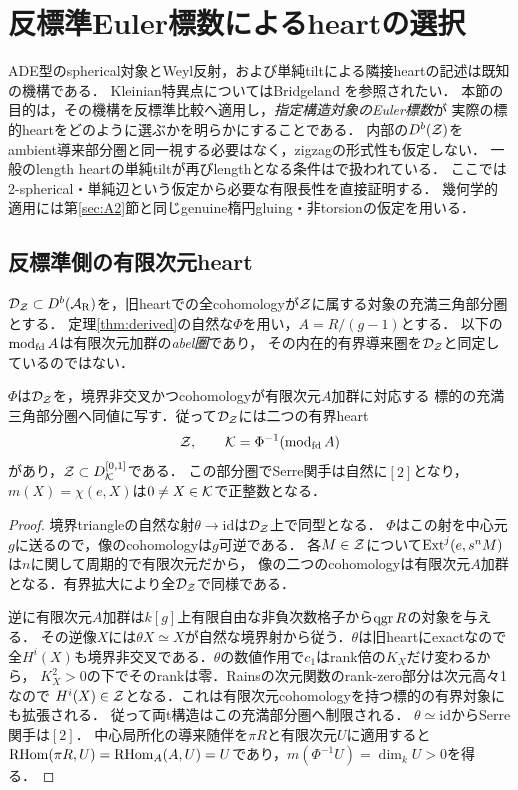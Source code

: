 \section{反標準Euler標数によるheartの選択}\label{sec:rootchambers}
ADE型のspherical対象とWeyl反射，および単純tiltによる隣接heartの記述は既知の機構である．
Kleinian特異点についてはBridgeland \cite[\S2, Lemma 3.5]{BridgelandKleinian}を参照されたい．
本節の目的は，その機構を反標準比較へ適用し，\emph{指定構造対象のEuler標数}が
実際の標的heartをどのように選ぶかを明らかにすることである．
内部の$D^b(\mathcal Z)$をambient導来部分圏と同一視する必要はなく，zigzagの形式性も仮定しない．
一般のlength heartの単純tiltが再びlengthとなる条件は\cite[Theorem 2.7]{BCPW}で扱われている．
ここでは2-spherical・単純辺という仮定から必要な有限長性を直接証明する．
幾何学的適用には第\ref{sec:A2}節と同じgenuine楕円gluing・非torsionの仮定を用いる．

\subsection{反標準側の有限次元heart}
$\mathcal D_{\mathcal Z}\subset D^b(\mathcal A_{\mathrm R})$を，旧heartでの全cohomologyが$\mathcal Z$に属する対象の充満三角部分圏とする．
定理\ref{thm:derived}の自然な$\Phi$を用い，$A=R/(g-1)$とする．
以下の$\operatorname{mod}_{\rm fd}A$は有限次元加群の\emph{abel圏}であり，
その内在的有界導来圏を$\mathcal D_{\mathcal Z}$と同定しているのではない．

\begin{lemma}\label{lem:targetfiniteheart}
$\Phi$は$\mathcal D_{\mathcal Z}$を，境界非交叉かつcohomologyが有限次元$A$加群に対応する
標的の充満三角部分圏へ同値に写す．従って$\mathcal D_{\mathcal Z}$には二つの有界heart
\[
 \mathcal Z,\qquad \mathcal K=\Phi^{-1}(\operatorname{mod}_{\rm fd}A)
\]
があり，$\mathcal Z\subset D^{[0,1]}_{\mathcal K}$である．
この部分圏でSerre関手は自然に$[2]$となり，
$m(X)=\chi(e,X)$は$0\ne X\in\mathcal K$で正整数となる．
\end{lemma}
\begin{proof}
境界triangleの自然な射$\theta\to\mathrm{id}$は$\mathcal D_{\mathcal Z}$上で同型となる．
$\Phi$はこの射を中心元$g$に送るので，像のcohomologyは$g$可逆である．
各$M\in\mathcal Z$について$\operatorname{Ext}^j(e,s^nM)$は$n$に関して周期的で有限次元だから，
像の二つのcohomologyは有限次元$A$加群となる．有界拡大により全$\mathcal D_{\mathcal Z}$で同様である．

逆に有限次元$A$加群は$k[g]$上有限自由な非負次数格子から$\operatorname{qgr} R$の対象を与える．
その逆像$X$には$\theta X\simeq X$が自然な境界射から従う．$\theta$は旧heartにexactなので
全$H^i(X)$も境界非交叉である．$\theta$の数値作用で$c_1$はrank倍の$K_X$だけ変わるから，
$K_X^2>0$の下でそのrankは零．Rainsの次元関数のrank-zero部分は次元高々1なので
$H^i(X)\in\mathcal Z$となる．これは有限次元cohomologyを持つ標的の有界対象にも拡張される．
従って両t構造はこの充満部分圏へ制限される．
$\theta\simeq\mathrm{id}$からSerre関手は$[2]$．
中心局所化の導来随伴を$\pi R$と有限次元$U$に適用すると
$\operatorname{RHom}(\pi R,U)=\operatorname{RHom}_A(A,U)=U$であり，$m(\Phi^{-1}U)=\dim_k U>0$を得る．
\end{proof}

